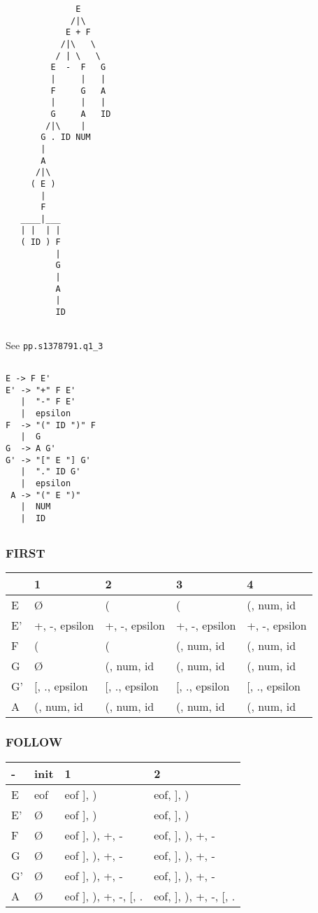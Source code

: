 \begin{verbatim}
              E
             /|\
            E + F
           /|\   \
          / | \   \
         E  -  F   G
         |     |   |
         F     G   A
         |     |   |
         G     A   ID
        /|\    |
       G . ID NUM
       |
       A
      /|\
     ( E )
       |
       F
   ____|___
   | |  | |
   ( ID ) F
          |
          G
          |
          A
          |
          ID
\end{verbatim}

\subsection{}
See \texttt{pp.s1378791.q1\_3}

\subsection{}
\begin{verbatim}
E -> F E'
E' -> "+" F E'
   |  "-" F E'
   |  epsilon
F  -> "(" ID ")" F
   |  G
G  -> A G'
G' -> "[" E "] G'
   |  "." ID G'
   |  epsilon
 A -> "(" E ")"
   |  NUM
   |  ID
\end{verbatim}

\subsection{}
\subsubsection{FIRST}
\begin{tabular}{lllll}
& 1 & 2 & 3 & 4 \\
\hline
E & Ø & ( & ( & (, num, id \\
E'& +, -, epsilon & +, -, epsilon & +, -, epsilon & +, -, epsilon \\
F & ( & ( & (, num, id & (, num, id \\
G & Ø & (, num, id & (, num, id &  (, num, id \\
G'& [, ., epsilon & [, ., epsilon & [, ., epsilon & [, ., epsilon \\
A & (, num, id & (, num, id & (, num, id & (, num, id \\
\end{tabular}

\subsubsection{FOLLOW}
\begin{tabular}{llll}
- & init & 1 & 2 \\
\hline
E & eof & eof ], )              & eof, ], ) \\
E'& Ø & eof ], )                & eof, ], ) \\
F & Ø & eof ], ), +, -          & eof, ], ), +, - \\
G & Ø & eof ], ), +, -          & eof, ], ), +, - \\
G'& Ø & eof ], ), +, -          & eof, ], ), +, - \\
A & Ø & eof ], ), +, -, [, .    & eof, ], ), +, -, [, . \\
\end{tabular}

